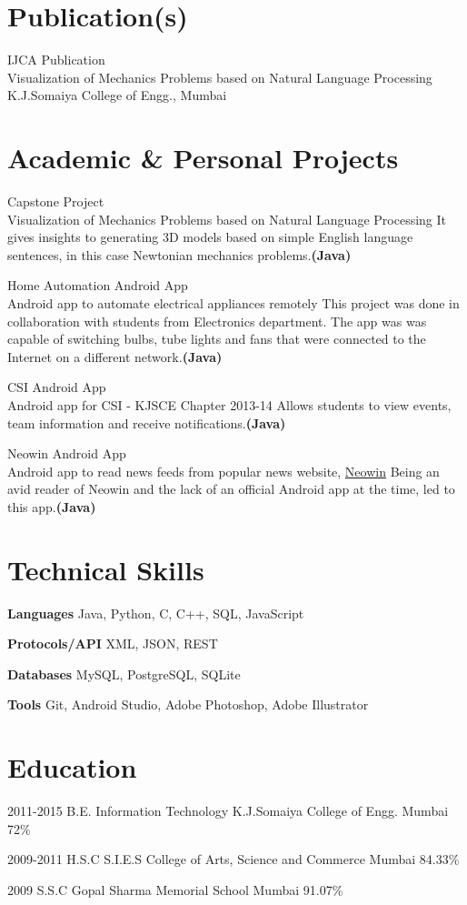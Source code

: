 \documentclass[10pt, a4paper, sans]{moderncv}
\begin{document}
\section{Publication(s)}
\cventry
{IJCA Publication \\
\href{http://www.ijcaonline.org/archives/volume116/number14/20408-2766}{\faFile}}
{Visualization of Mechanics Problems based on
Natural Language Processing}
{K.J.Somaiya College of Engg., Mumbai}
{}
{}
{}

\section{Academic \& Personal Projects}
\cventry
{Capstone Project \\ {\faGithub}}
{Visualization of Mechanics Problems based on
Natural Language Processing}
{}
{}
{}
{It gives insights to generating 3D models based on simple English language sentences, in this case Newtonian mechanics problems.\bfseries{(Java)}}

\cventry
{Home Automation Android App \\ {\faAndroid}}
{Android app to automate electrical appliances remotely}
{}
{}
{}
{This project was done in collaboration with students from Electronics department. The app was was capable of switching bulbs,  tube lights and fans that were connected to the Internet on a different network.\bfseries{(Java)}}

\cventry
{CSI Android App \\ {\faAndroid}}
{Android app for CSI - KJSCE Chapter 2013-14}
{}
{}
{}
{Allows students to view events, team information and receive notifications.\bfseries{(Java)}}

\cventry
{Neowin Android App \\ {\faAndroid}}
{Android app to read news feeds from popular news website, \href{http://www.neowin.net/}{Neowin}}
{}
{}
{}
{Being an avid reader of Neowin and the lack of an official Android app at the time, led to this app.\bfseries{(Java)}}

\section{Technical Skills}
\cvitem
{\bfseries{Languages}}
{Java, Python, C, C++, SQL, JavaScript}

\cvitem
{\bfseries{Protocols/API}}
{XML, JSON, REST}

\cvitem
{\bfseries{Databases}}
{MySQL, PostgreSQL, SQLite}

\cvitem
{\bfseries{Tools}}
{Git, Android Studio, Adobe Photoshop, Adobe Illustrator}

\section{Education}
\cventry
{2011-2015}
{B.E. Information Technology}
{K.J.Somaiya College of Engg.}
{Mumbai}
{72\%}
{}

\cventry
{2009-2011}
{H.S.C}
{S.I.E.S College of Arts, Science and Commerce}
{Mumbai}
{84.33\%}
{}

\cventry
{2009}
{S.S.C}
{Gopal Sharma Memorial School}
{Mumbai}
{91.07\%}
{}
\end{document}
